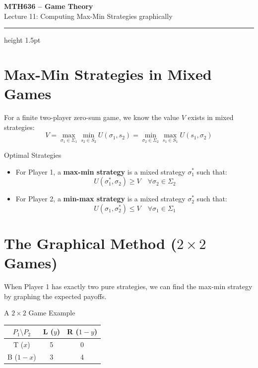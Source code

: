 \documentclass[12pt, a4paper]{article}
\begin{document}
\begin{center}
  {\LARGE\bfseries\sffamily\color{defblue} MTH636 -- Game Theory}\\[6pt]
  {\Large\sffamily Lecture 11: Computing Max-Min Strategies graphically}\\[4pt]
\end{center}
\vspace{0.5cm}
\hrule height 1.5pt
\vspace{0.3cm}

\section{Max-Min Strategies in Mixed Games}

For a finite two-player zero-sum game, we know the value $V$ exists in mixed strategies:
\[
  V = \max_{\sigma_1 \in \Sigma_1} \min_{s_2 \in S_2} U(\sigma_1, s_2) = \min_{\sigma_2 \in \Sigma_2} \max_{s_1 \in S_1} U(s_1, \sigma_2)
\]

\begin{defbox}{Optimal Strategies}
  \begin{itemize}
      \item For Player 1, a \textbf{max-min strategy} is a mixed strategy $\sigma_1^*$ such that:
      \[
        U(\sigma_1^*, \sigma_2) \geq V \quad \forall \sigma_2 \in \Sigma_2
      \]
      \item For Player 2, a \textbf{min-max strategy} is a mixed strategy $\sigma_2^*$ such that:
      \[
        U(\sigma_1, \sigma_2^*) \leq V \quad \forall \sigma_1 \in \Sigma_1
      \]
  \end{itemize}
\end{defbox}

\section{The Graphical Method ($2 \times 2$ Games)}

When Player 1 has exactly two pure strategies, we can find the max-min strategy by graphing the expected payoffs.

\begin{exbox}{A $2 \times 2$ Game Example}
  \begin{center}
  \renewcommand{\arraystretch}{1.3}
  \begin{tabular}{c|cc}
    $P_1 \setminus P_2$ & L ($y$) & R ($1-y$) \\
    \hline
    T ($x$) & 5 & 0 \\
    B ($1-x$) & 3 & 4 \\
  \end{tabular}
  \end{center}
\end{exbox}
\end{document}
